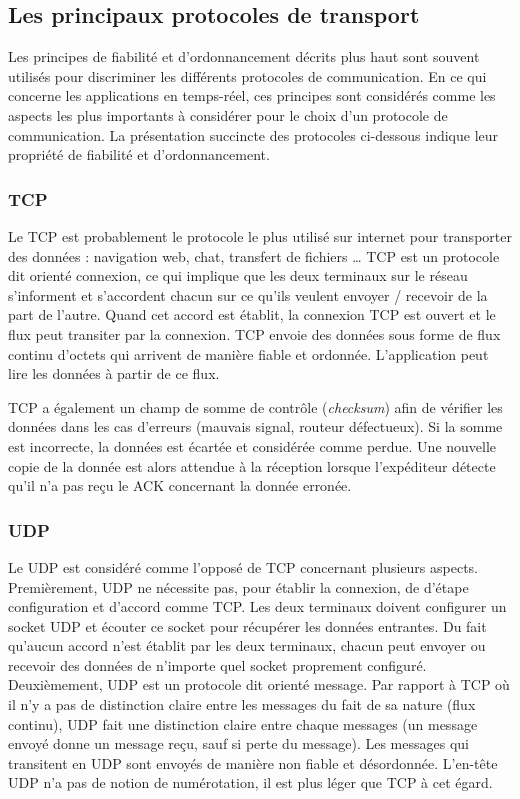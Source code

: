 \subsection{Les principaux protocoles de transport}
Les principes de fiabilité et d'ordonnancement décrits plus haut sont souvent 
utilisés pour discriminer les différents protocoles de communication. En ce qui concerne les 
applications en temps-réel, ces principes sont considérés comme les aspects les plus 
importants à considérer pour le choix d'un protocole de communication. La 
présentation succincte des protocoles ci-dessous indique leur propriété de 
fiabilité et d'ordonnancement.
\subsubsection{TCP}
Le \gls{TCP} est probablement le protocole le plus utilisé sur internet pour 
transporter des données : navigation web, chat, transfert de fichiers \dots 
\gls{TCP} est un protocole dit \og orienté connexion\fg{}, ce qui implique que les 
deux terminaux sur le réseau s'informent et s'accordent chacun sur ce qu'ils 
veulent envoyer / recevoir de la part de l'autre. 
Quand cet accord est établit, la connexion \gls{TCP} est ouvert et le flux peut 
transiter par la connexion. 
\gls{TCP} envoie des données sous forme de flux continu d'octets qui arrivent de 
manière fiable et ordonnée. 
L'application peut lire les données à partir de ce flux.

\gls{TCP} a également un champ de somme de contrôle (\textit{checksum}) afin 
de vérifier les données dans les cas d'erreurs (mauvais signal, routeur 
défectueux). 
Si la somme est incorrecte, la données est écartée et considérée comme perdue. 
Une nouvelle copie de la donnée est alors attendue à la réception lorsque 
l'expéditeur détecte qu'il n'a pas reçu le ACK concernant la donnée erronée.

\subsubsection{UDP}
Le \gls{UDP} est considéré comme l'opposé de \gls{TCP} concernant plusieurs 
aspects. Premièrement, \gls{UDP} ne nécessite pas, pour établir la connexion, de 
d'étape configuration et d'accord comme \gls{TCP}. Les deux terminaux doivent 
configurer un socket \gls{UDP} et écouter ce socket pour récupérer les données 
entrantes. Du fait qu'aucun accord n'est établit par les deux terminaux, chacun 
peut envoyer ou recevoir des données de n'importe quel socket proprement 
configuré.
Deuxièmement, \gls{UDP} est un protocole dit \og orienté message\fg{}. Par 
rapport à \gls{TCP} où il n'y a pas de distinction claire entre les messages du fait 
de sa nature (flux continu), \gls{UDP} fait une distinction claire entre chaque 
messages (un message envoyé donne un message reçu, sauf si perte du 
message). Les messages qui transitent en \gls{UDP} sont envoyés de manière 
non fiable et désordonnée. L'en-tête \gls{UDP} n'a pas de notion de numérotation, il 
est plus léger que \gls{TCP} à cet égard.

